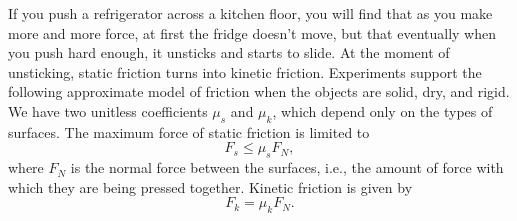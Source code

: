 If you push a refrigerator across a kitchen floor, you will find that as
you make more and more force, at first the fridge doesn't move, but that
eventually when you push hard enough, it unsticks and starts to slide.
At the moment of unsticking, static friction turns into kinetic friction.
Experiments support the following approximate
model of friction when the objects are solid, dry, and rigid.
We have two unitless coefficients $\mu_s$ and $\mu_k$, which depend only on
the types of surfaces. The maximum force of static friction is limited to
\begin{equation}
  F_s \le \mu_s F_N,
\end{equation}
where $F_N$ is the normal force between the surfaces, i.e., the amount of
force with which they are being pressed together. Kinetic friction is
given by
\begin{equation}
  F_k = \mu_k F_N.
\end{equation}
